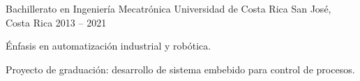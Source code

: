 
\begin{cventries}

  \cventry
    {Bachillerato en Ingeniería Mecatrónica}
    {Universidad de Costa Rica}
    {San José, Costa Rica}
    {2013 -- 2021}
    {
      \begin{cvitems}
        \item {Énfasis en automatización industrial y robótica.}
        \item {Proyecto de graduación: desarrollo de sistema embebido para control de procesos.}
      \end{cvitems}
    }

\end{cventries}
